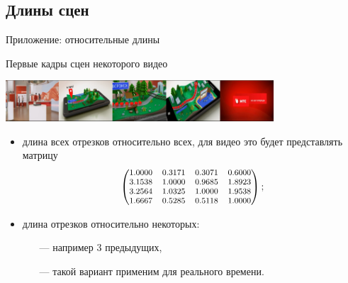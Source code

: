
\subsection{Длины сцен}


\begin{frame}{Приложение: относительные длины}

    \begin{center}
        Первые кадры сцен некоторого видео\par
        \vspace{0.5em}
        \includegraphics[width=10cm]{img/video/mts-scene.png}
    \end{center}

    \begin{itemize}
        \item длина всех отрезков относительно всех,
        для видео это будет представлять матрицу
        \[ \footnotesize
            \left(
                \begin{matrix}
                    1.0000 & 0.3171 & 0.3071 & 0.6000 \\
                    3.1538 & 1.0000 & 0.9685 & 1.8923 \\
                    3.2564 & 1.0325 & 1.0000 & 1.9538 \\
                    1.6667 & 0.5285 & 0.5118 & 1.0000 \\
                \end{matrix}
            \right);
        \]
        \item длина отрезков относительно некоторых:
        \begin {itemize}
            \item[---] например $3$ предыдущих,
            \item[---] такой вариант применим для реального времени.
        \end{itemize}
    \end{itemize}
\end{frame}

